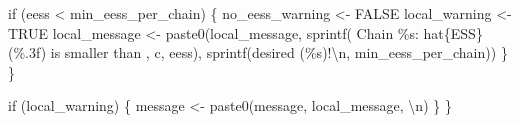 \documentclass[
  letterpaper,
  DIV=11,
  numbers=noendperiod]{scrartcl}
\newenvironment{Shaded}{\begin{snugshade}}{\end{snugshade}}
\newcommand{\ConstantTok}[1]{\textcolor[rgb]{0.56,0.35,0.01}{#1}}
\newcommand{\ControlFlowTok}[1]{\textcolor[rgb]{0.00,0.23,0.31}{#1}}
\newcommand{\FunctionTok}[1]{\textcolor[rgb]{0.28,0.35,0.67}{#1}}
\newcommand{\NormalTok}[1]{\textcolor[rgb]{0.00,0.23,0.31}{#1}}
\newcommand{\OtherTok}[1]{\textcolor[rgb]{0.00,0.23,0.31}{#1}}
\newcommand{\SpecialCharTok}[1]{\textcolor[rgb]{0.37,0.37,0.37}{#1}}
\newcommand{\StringTok}[1]{\textcolor[rgb]{0.13,0.47,0.30}{#1}}
\begin{document}
\begin{Shaded}
\begin{Highlighting}[]
      \ControlFlowTok{if}\NormalTok{ (eess }\SpecialCharTok{\textless{}}\NormalTok{ min\_eess\_per\_chain) \{}
\NormalTok{        no\_eess\_warning }\OtherTok{\textless{}{-}} \ConstantTok{FALSE}
\NormalTok{        local\_warning }\OtherTok{\textless{}{-}} \ConstantTok{TRUE}
\NormalTok{        local\_message }\OtherTok{\textless{}{-}}
          \FunctionTok{paste0}\NormalTok{(local\_message,}
                 \FunctionTok{sprintf}\NormalTok{(}\StringTok{\textquotesingle{}  Chain \%s: hat\{ESS\} (\%.3f) is smaller than \textquotesingle{}}\NormalTok{,}
\NormalTok{                         c, eess),}
                 \FunctionTok{sprintf}\NormalTok{(}\StringTok{\textquotesingle{}desired (\%s)!}\SpecialCharTok{\textbackslash{}n}\StringTok{\textquotesingle{}}\NormalTok{, min\_eess\_per\_chain))}
\NormalTok{      \}}
\NormalTok{    \}}
    
    \ControlFlowTok{if}\NormalTok{ (local\_warning) \{}
\NormalTok{      message }\OtherTok{\textless{}{-}} \FunctionTok{paste0}\NormalTok{(message, local\_message, }\StringTok{\textquotesingle{}}\SpecialCharTok{\textbackslash{}n}\StringTok{\textquotesingle{}}\NormalTok{)}
\NormalTok{    \}}
\NormalTok{  \}}


\end{Highlighting}
\end{Shaded}
\end{document}
